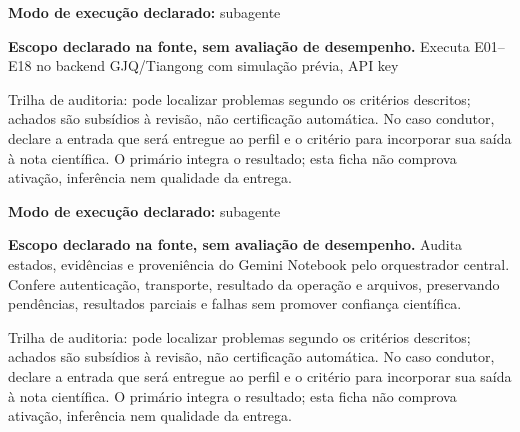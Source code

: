 \begin{arquitetura}
\textbf{Modo de execução declarado:} subagente
\end{arquitetura}


\begin{descricao}
\textbf{Escopo declarado na fonte, sem avaliação de desempenho.}
Executa E01–E18 no backend GJQ/Tiangong com simulação prévia, API key
\end{descricao}

\begin{funcao}
Trilha de auditoria: pode localizar problemas segundo os critérios descritos; achados são subsídios à revisão, não certificação automática. No caso condutor, declare a entrada que será entregue ao perfil e o critério para incorporar sua saída à nota científica. O primário integra o resultado; esta ficha não comprova ativação, inferência nem qualidade da entrega.
\end{funcao}

\begin{arquitetura}
\textbf{Modo de execução declarado:} subagente
\end{arquitetura}


\begin{descricao}
\textbf{Escopo declarado na fonte, sem avaliação de desempenho.}
Audita estados, evidências e proveniência do Gemini Notebook pelo orquestrador central. Confere autenticação, transporte, resultado da operação e arquivos, preservando pendências, resultados parciais e falhas sem promover confiança científica.
\end{descricao}

\begin{funcao}
Trilha de auditoria: pode localizar problemas segundo os critérios descritos; achados são subsídios à revisão, não certificação automática. No caso condutor, declare a entrada que será entregue ao perfil e o critério para incorporar sua saída à nota científica. O primário integra o resultado; esta ficha não comprova ativação, inferência nem qualidade da entrega.
\end{funcao}

